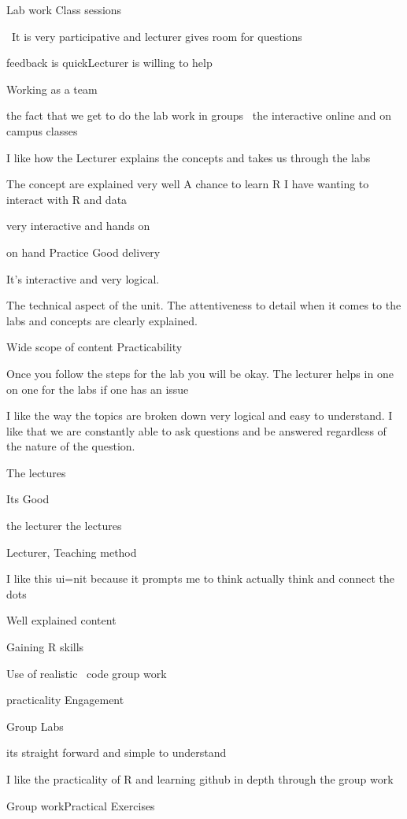 \documentclass[
]{article}
\begin{document}
\begin{enumerate}
\begin{itemize}
    Lab work Class sessions

    ~It is very participative and lecturer gives room for questions

    feedback is quickLecturer is willing to help

    Working as a team

    the fact that we get to do the lab work in groups~ the interactive
    online and on campus classes

    I like how the Lecturer explains the concepts and takes us through
    the labs

    The concept are explained very well A chance to learn R I have
    wanting to interact with R and data

    very interactive and hands on

    on hand Practice Good delivery

    It's interactive and very logical.

    The technical aspect of the unit. The attentiveness to detail when
    it comes to the labs and concepts are clearly explained.

    Wide scope of content Practicability

    Once you follow the steps for the lab you will be okay. The lecturer
    helps in one on one for the labs if one has an issue

    I like the way the topics are broken down very logical and easy to
    understand. I like that we are constantly able to ask questions and
    be answered regardless of the nature of the question.

    The lectures

    Its Good

    the lecturer the lectures

    Lecturer, Teaching method

    I like this ui=nit because it prompts me to think actually think and
    connect the dots~

    Well explained content

    Gaining R skills

    Use of realistic~ code group work

    practicality Engagement

    Group Labs

    its straight forward and simple to understand~

    I like the practicality of R and learning github in depth through
    the group work

    Group workPractical Exercises


\end{itemize}
\end{enumerate}
\end{document}

